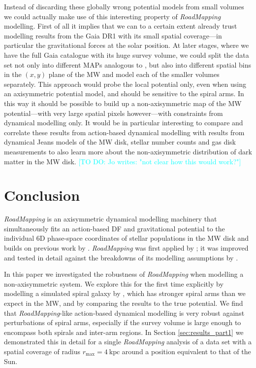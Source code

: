 \documentclass[iop,revtex4,numberedappendix,appendixfloats]{emulateapj}
\newcommand{\RM}{{\sl RoadMapping}}
\newcommand{\Jo}[1]{\textcolor{Cyan}{#1}}
\begin{document}
Instead of discarding these globally wrong potential models from small volumes we could actually make use of this interesting property of \RM{} modelling. First of all it implies that we can to a certain extent already trust modelling results from the Gaia DR1 with its small spatial coverage---in particular the gravitational forces at the solar position. At later stages, where we have the full Gaia catalogue with its huge survey volume, we could split the data set not only into different MAPs analogous to \citet{2013ApJ...779..115B}, but also into different spatial bins in the $(x,y)$ plane of the MW and model each of the smaller volumes separately. This approach would probe the local potential only, even when using an axisymmetric potential model, and should be sensitive to the spiral arms. In this way it should be possible to build up a non-axisymmetric map of the MW potential---with very large spatial pixels however---with constraints from dynamical modelling only. It would be in particular interesting to compare and correlate these results from action-based dynamical modelling with results from dynamical Jeans models of the MW disk, stellar number counts and gas disk measurements to also learn more about the non-axisymmetric distribution of dark matter in the MW disk. \Jo{[TO DO: Jo writes: "not clear how this would work?"]}

\section{Conclusion} \label{sec:conclusion}

\RM{} is an axisymmetric dynamical modelling machinery that simultaneously fits an action-based DF and gravitational potential to the individual 6D phase-space coordinates of stellar populations in the MW disk and builds on previous work by \citet{2011MNRAS.413.1889B,2012MNRAS.426.1324B,2015ApJS..216...29B}. \RM{} was first applied by \citet{2013ApJ...779..115B}; it was improved and tested in detail against the breakdowns of its modelling assumptions by \citet{2016arXiv160508601T}.  

In this paper we investigated the robustness of \RM{} when modelling a non-axisymmetric system. We explore this for the first time explicitly by modelling a simulated spiral galaxy by \citet{2013ApJ...766...34D}, which has stronger spiral arms than we expect in the MW, and by comparing the results to the true potential. We find that \RM{}-like action-based dynamical modelling is very robust against perturbations of spiral arms, especially if the survey volume is large enough to encompass both spirals and inter-arm regions. In Section \ref{sec:results_part1} we demonstrated this in detail for a single \RM{} analysis of a data set with a spatial coverage of radius $r_\text{max}=4~\text{kpc}$ around a position equivalent to that of the Sun.
\end{document}
